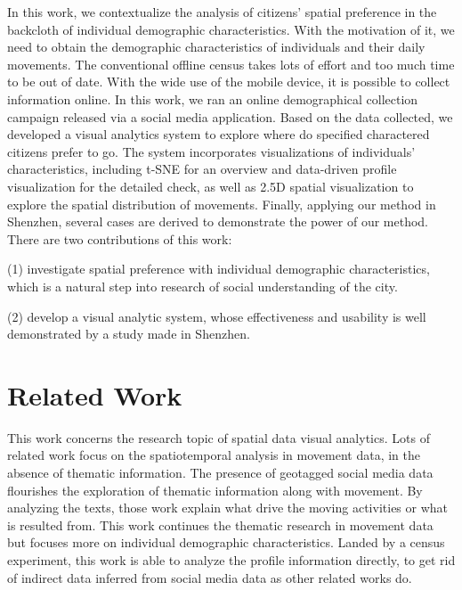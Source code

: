 \documentclass{ieeeaccess}
\begin{document}
In this work, we contextualize the analysis of citizens' spatial preference in the backcloth of individual demographic characteristics. With the motivation of it, we need to obtain the demographic characteristics of individuals and their daily movements. The conventional offline census takes lots of effort and too much time to be out of date. With the wide use of the mobile device, it is possible to collect information online. In this work, we ran an online demographical collection campaign released via a social media application. Based on the data collected, we developed a visual analytics system to explore where do specified charactered citizens prefer to go. The system incorporates visualizations of individuals' characteristics, including t-SNE for an overview and data-driven profile visualization for the detailed check, as well as 2.5D spatial visualization to explore the spatial distribution of movements. Finally, applying our method in Shenzhen, several cases are derived to demonstrate the power of our method. There are two contributions of this work:

(1) investigate spatial preference with individual demographic characteristics, which is a natural step into research of social understanding of the city.

(2) develop a visual analytic system, whose effectiveness and usability is well demonstrated by a study made in Shenzhen.



\section{Related Work}
This work concerns the research topic of spatial data visual analytics. Lots of related work focus on the spatiotemporal analysis in movement data, in the absence of thematic information. The presence of geotagged social media data flourishes the exploration of thematic information along with movement. By analyzing the texts, those work explain what drive the moving activities or what is resulted from. This work continues the thematic research in movement data but focuses more on individual demographic characteristics. Landed by a census experiment, this work is able to analyze the profile information directly, to get rid of indirect data inferred from social media data as other related works do.
\end{document}
